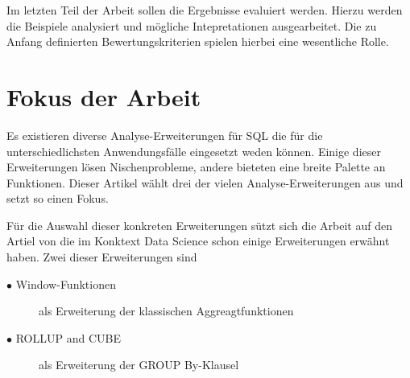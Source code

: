 Im letzten Teil der Arbeit sollen die Ergebnisse evaluiert werden. Hierzu
werden die Beispiele analysiert und mögliche Intepretationen ausgearbeitet. Die
zu Anfang definierten Bewertungskriterien spielen hierbei eine wesentliche Rolle.

\section{Fokus der Arbeit}
Es existieren diverse Analyse-Erweiterungen für SQL die für die unterschiedlichsten
Anwendungsfälle eingesetzt weden können. Einige dieser Erweiterungen lösen 
Nischenprobleme, andere bieteten eine breite Palette an Funktionen.
Dieser Artikel wählt drei der vielen Analyse-Erweiterungen aus und setzt so einen
Fokus.

Für die Auswahl dieser konkreten Erweiterungen sützt sich die Arbeit auf den Artiel
von \cite{FOTACHE2015243} die im Konktext Data Science schon einige Erweiterungen
erwähnt haben. Zwei dieser Erweiterungen sind

\begin{description}
    \item[$\bullet$ Window-Funktionen] als Erweiterung der klassischen Aggreagtfunktionen
    \item[$\bullet$ ROLLUP and CUBE] als Erweiterung der GROUP By-Klausel
\end{description}